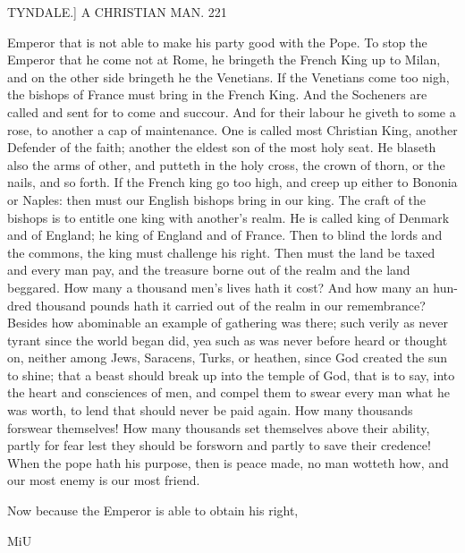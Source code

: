 \documentclass{custom}
\begin{document}
TYNDALE.]
A CHRISTIAN MAN.
221

Emperor that is not able to make his party good with the 
Pope. To stop the Emperor that he come not at Rome,
he bringeth the French King up to Milan, and on the 
other side bringeth he the Venetians. If the Venetians 
come too nigh, the bishops of France must bring in the 
French King. And the Socheners are called and sent for 
to come and succour. And for their labour he giveth to 
some a rose, to another a cap of maintenance. One is 
called most Christian King, another Defender of the faith;
another the eldest son of the most holy seat. He blaseth 
also the arms of other, and putteth in the holy cross, the 
crown of thorn, or the nails, and so forth. If the French 
king go too high, and creep up either to Bononia or 
Naples: then must our English bishops bring in our king. 
The craft of the bishops is to entitle one king with another's 
realm. He is called king of Denmark and of England;
he king of England and of France. Then to blind the lords 
and the commons, the king must challenge his right. Then 
must the land be taxed and every man pay, and the treasure 
borne out of the realm and the land beggared. How many a 
thousand men's lives hath it cost? And how many an hun- 
dred thousand pounds hath it carried out of the realm in our 
remembrance? Besides how abominable an example of 
gathering was there; such verily as never tyrant since the 
world began did, yea such as was never before heard or 
thought on, neither among Jews, Saracens, Turks, or 
heathen, since God created the sun to shine; that a beast 
should break up into the temple of God, that is to say, 
into the heart and consciences of men, and compel them 
to swear every man what he was worth, to lend that should 
never be paid again. How many thousands forswear 
themselves! How many thousands set themselves above 
their ability, partly for fear lest they should be forsworn 
and partly to save their credence! When the pope hath 
his purpose, then is peace made, no man wotteth how, 
and our most enemy is our most friend.

Now because the Emperor is able to obtain his right, 

MiU 
\end{document}

